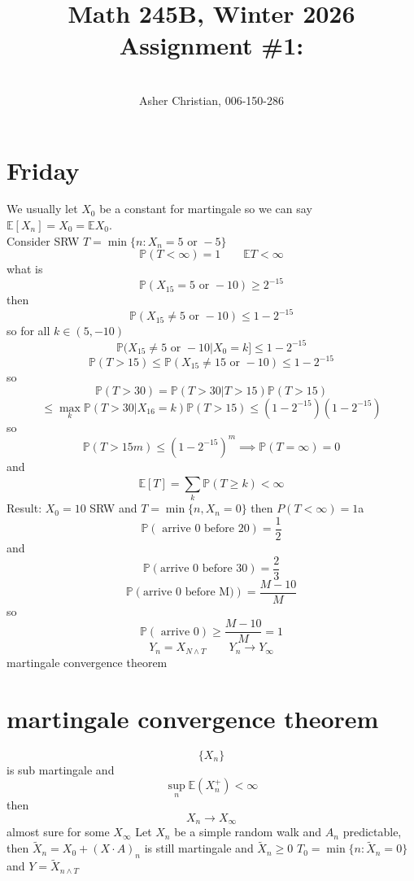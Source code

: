 \documentclass[11pt]{article}
\newcommand{\cnum}{Math 245B}
\newcommand{\ced}{Winter 2026}
\newcommand{\ctitle}[4]{\title{\vspace{-0.5in}\cnum, \ced\\Assignment #1: #2}\author{\vspace{-0.35in}\\#3, #4}}
\begin{document}
\ctitle{\#1}{}{Asher Christian}{006-150-286}
\date{}
\maketitle
\section{Friday}
We usually let $X_0$ be a constant for martingale so we can say $ \mathbb{E}[X_n] = X_0 = \mathbb{E}X_0$.\\
Consider SRW $T = \min\{n : X_n = 5 \text{ or } -5\}$
 \[
\mathbb{P}(T < \infty) = 1 \qquad \mathbb{E}T < \infty
\] 
what is
\[
\mathbb{P}(X_{15} = 5 \text { or } -10) \ge 2^{-15}
\] 
then
\[
    \mathbb{P}(X_{15} \ne 5 \text{ or } -10 ) \le 1 - 2^{-15}
\] 
so for all $k \in (5,-10)$
\[
    \mathbb{P}(X_{15} \ne 5 \text{ or } -10 | X_0 = k] \le 1 - 2^{-15}
\] 
\[
    \mathbb{P}(T > 15) \le \mathbb{P}(X_{15} \ne 15 \text{ or } -10) \le 1 - 2^{-15}
\] 
so
\[
\mathbb{P}(T > 30) = \mathbb{P}(T > 30 | T > 15) \mathbb{P}(T > 15) 
\] 
\[
    \le \max_k \mathbb{P}(T > 30 | X_{16} = k) \mathbb{P}(T > 15) \le (1-2^{-15})(1-2^{-15})
\] 
so
\[
\mathbb{P}(T > 15 m) \le (1-2^{-15})^{m} \implies \mathbb{P}(T = \infty) = 0
\] 
and
\[
    \mathbb{E}[T] = \sum_{k}^{} \mathbb{P}(T \ge k) < \infty
\] 
Result: $X_0 = 10$ SRW and $T = \min\{n, X_n = 0\}$ then  $P(T < \infty) = 1$a
\[
    \mathbb{P}(\text{ arrive 0 before 20}) = \frac{1}{2}
\] 
and
\[
    \mathbb{P}(\text{arrive 0 before 30}) = \frac{2}{3}
\] 
\[
    \mathbb{P}(\text{arrive 0 before M)}) = \frac{M-10}{M}
\] 
so
\[
    \mathbb{P}(\text{ arrive 0}) \ge \frac{M-10}{M} = 1
\] 
\[
    Y_n = X_{N \wedge T} \qquad Y_n \rightarrow Y_\infty
\] 
martingale convergence theorem
\section{martingale convergence theorem}
\[
    \{X_n\}
\] 
is sub martingale and
\[
    \sup_{n} \mathbb{E}(X_n^{+}) < \infty
\] 
then
\[
    X_n \rightarrow X_{\infty}
\] 
almost sure for some $X_\infty$
Let $X_n$ be a simple random walk and $A_n$ predictable, then $\tilde X_n = X_0 + (X \cdot A)_n$ is still martingale
and  $\tilde X_n \ge 0$  $T_0 = \min\{n : \tilde X_n = 0\}$ and $Y = \tilde X_{n \wedge T}$
\end{document}
